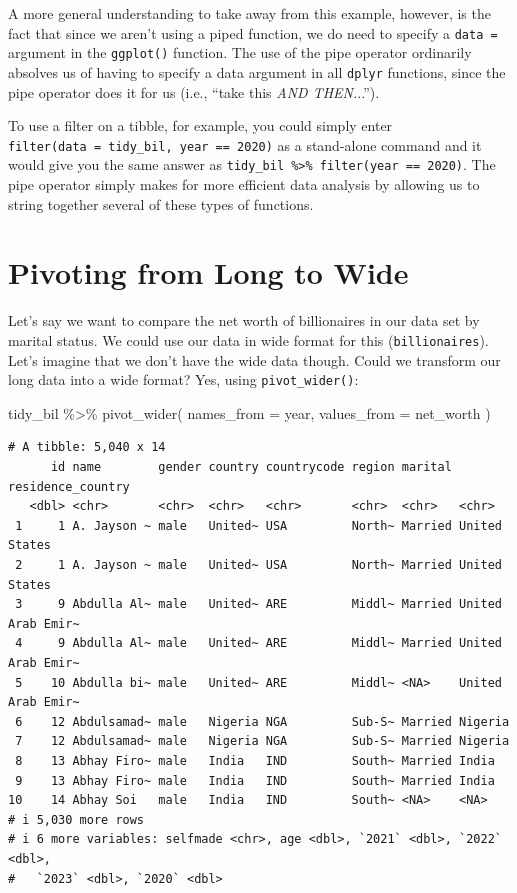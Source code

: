\documentclass[
  letterpaper,
]{book}
\newenvironment{Shaded}{\begin{snugshade}}{\end{snugshade}}
\newcommand{\AttributeTok}[1]{\textcolor[rgb]{0.40,0.45,0.13}{#1}}
\newcommand{\FunctionTok}[1]{\textcolor[rgb]{0.28,0.35,0.67}{#1}}
\newcommand{\NormalTok}[1]{\textcolor[rgb]{0.00,0.23,0.31}{#1}}
\newcommand{\SpecialCharTok}[1]{\textcolor[rgb]{0.37,0.37,0.37}{#1}}
\begin{document}
A more general understanding to take away from this example, however, is
the fact that since we aren't using a piped function, we do need to
specify a \texttt{data\ =} argument in the \texttt{ggplot()} function.
The use of the pipe operator ordinarily absolves us of having to specify
a data argument in all \texttt{dplyr} functions, since the pipe operator
does it for us (i.e., ``take this \emph{AND THEN.}..'').

To use a filter on a tibble, for example, you could simply enter
\texttt{filter(data\ =\ tidy\_bil,\ year\ ==\ 2020)} as a stand-alone
command and it would give you the same answer as
\texttt{tidy\_bil\ \%\textgreater{}\%\ filter(year\ ==\ 2020)}. The pipe
operator simply makes for more efficient data analysis by allowing us to
string together several of these types of functions.

\hypertarget{pivoting-from-long-to-wide}{%
\section{Pivoting from Long to Wide}\label{pivoting-from-long-to-wide}}

Let's say we want to compare the net worth of billionaires in our data
set by marital status. We could use our data in wide format for this
(\texttt{billionaires}). Let's imagine that we don't have the wide data
though. Could we transform our long data into a wide format? Yes, using
\texttt{pivot\_wider()}:

\begin{Shaded}
\begin{Highlighting}[]
\NormalTok{tidy\_bil }\SpecialCharTok{\%\textgreater{}\%}
  \FunctionTok{pivot\_wider}\NormalTok{(}
    \AttributeTok{names\_from =}\NormalTok{ year,}
    \AttributeTok{values\_from =}\NormalTok{ net\_worth}
\NormalTok{  )}
\end{Highlighting}
\end{Shaded}

\begin{verbatim}
# A tibble: 5,040 x 14
      id name        gender country countrycode region marital residence_country
   <dbl> <chr>       <chr>  <chr>   <chr>       <chr>  <chr>   <chr>            
 1     1 A. Jayson ~ male   United~ USA         North~ Married United States    
 2     1 A. Jayson ~ male   United~ USA         North~ Married United States    
 3     9 Abdulla Al~ male   United~ ARE         Middl~ Married United Arab Emir~
 4     9 Abdulla Al~ male   United~ ARE         Middl~ Married United Arab Emir~
 5    10 Abdulla bi~ male   United~ ARE         Middl~ <NA>    United Arab Emir~
 6    12 Abdulsamad~ male   Nigeria NGA         Sub-S~ Married Nigeria          
 7    12 Abdulsamad~ male   Nigeria NGA         Sub-S~ Married Nigeria          
 8    13 Abhay Firo~ male   India   IND         South~ Married India            
 9    13 Abhay Firo~ male   India   IND         South~ Married India            
10    14 Abhay Soi   male   India   IND         South~ <NA>    <NA>             
# i 5,030 more rows
# i 6 more variables: selfmade <chr>, age <dbl>, `2021` <dbl>, `2022` <dbl>,
#   `2023` <dbl>, `2020` <dbl>
\end{verbatim}
\end{document}
